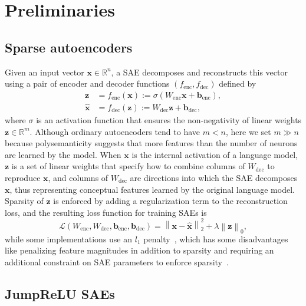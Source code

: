 \documentclass{article}
\newcommand\enc{\mathrm{enc}}
\newcommand\dec{\mathrm{dec}}
\begin{document}
\section{Preliminaries}
\label{sec:preliminaries}

\subsection{Sparse autoencoders}
\label{sec:sparse-autoencoders}

Given an input vector \(\mathbf{x} \in \mathbb{R}^n\), a SAE decomposes and reconstructs this vector using a
pair of encoder and decoder functions \(\left( f_{\enc}, f_{\dec} \right)\) defined by
\begin{align}
\label{eq:1}
  \mathbf{z} &= f_{\enc} \left( \mathbf{x} \right) := \sigma \left( W_{\enc} \mathbf{x} +
               \mathbf{b}_{\enc} \right), \\
  \hat{\mathbf{x}} &= f_{\dec} \left( \mathbf{z} \right) := W_{\dec} \mathbf{z} + \mathbf{b}_{\dec},
\end{align}
where \(\sigma\) is an activation function that ensures the non-negativity of linear
weights \(\mathbf{z} \in \mathbb{R}^m\). Although ordinary autoencoders tend to have \(m<n\), here we
set \(m \gg n\) because polysemanticity suggests that more features than the number of neurons are
learned by the model. When \(\mathbf{x}\) is the internal activation of a language
model, \(\mathbf{z}\) is a set of linear weights that specify how to combine columns of \(W_{\dec}\)
to reproduce \(\mathbf{x}\), and columns of \(W_{\dec}\) are directions into which the SAE
decomposes \(\mathbf{x}\), thus representing conceptual features learned by the original language
model. Sparsity of \(\mathbf{z}\) is enforced by adding a regularization term to the reconstruction
loss, and the resulting loss function for training SAEs is
\begin{equation}
\label{eq:2}
\mathcal{L} \left( W_{\enc}, W_{\dec}, \mathbf{b}_{\enc}, \mathbf{b}_{\dec} \right) = \left\| \mathbf{x} -
  \hat{\mathbf{x}} \right\|_2^2 + \lambda \left\| \mathbf{z} \right\|_0,
\end{equation}
while some implementations use an \(l_1\) penalty~\citep{cunningham2023Sparse, gao2024Scaling},
which has some disadvantages like penalizing feature magnitudes in addition to sparsity and
requiring an additional constraint on SAE parameters to enforce
sparsity~\citep{rajamanoharan2024Jumping}.

\subsection{JumpReLU SAEs}
\label{sec:jumprelu-saes}
\end{document}
